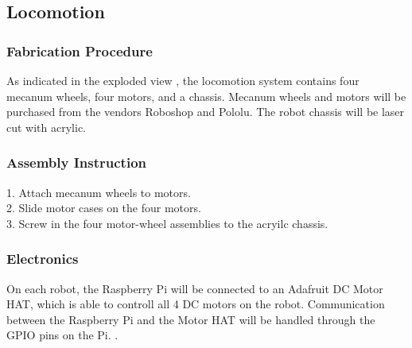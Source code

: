 
\subsection{Locomotion}
\label{sec:hardware_locomotion}

\subsubsection{Fabrication Procedure}
\label{sec:locomotion_fab}
As indicated in the exploded view , the locomotion system contains four mecanum wheels, four motors, and a chassis. Mecanum wheels and motors will be purchased from the vendors Roboshop and Pololu. The robot chassis will be laser cut with acrylic.

\subsubsection{Assembly Instruction}
\label{sec:locomotion_assemb}
1. Attach mecanum wheels to motors.\\
2. Slide motor cases on the four motors. \\
3. Screw in the four motor-wheel assemblies to the acryilc chassis.

\subsubsection{Electronics}
\label{sec:locomotion_electronics}
On each robot, the Raspberry Pi will be connected to an Adafruit DC Motor HAT, which is able to controll all 4 DC motors on the robot. Communication between the Raspberry Pi and the Motor HAT will be handled through the GPIO pins on the Pi.  .

